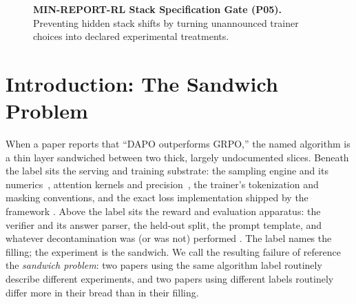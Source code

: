 \documentclass{article}  \usepackage[preprint,nonatbib]{neurips_2026} \usepackage[numbers]{natbib}
\begin{document}
\begin{figure}[htbp]
\centering
{}
\caption{\textbf{MIN-REPORT-RL Stack Specification Gate (P05).} Preventing hidden stack shifts by turning unannounced trainer choices into declared experimental treatments.}
\label{fig:p5_minreport_gate}
\end{figure}
\section{Introduction: The Sandwich Problem}
\label{sec:p5-intro}
When a paper reports that ``DAPO outperforms GRPO,'' the named algorithm is a
thin layer sandwiched between two thick, largely undocumented slices. Beneath the
label sits the serving and training substrate: the sampling engine and its
numerics~\citep{kwon2023vllm, zheng2024sglang}, attention kernels and
precision~\citep{dao2022flashattention}, the trainer's tokenization and masking
conventions, and the exact loss implementation shipped by the framework
\citep{vonwerra2022trl, sheng2024verl, hu2024openrlhf, thinkingmachines2024tinker}.
Above the label sits the reward and evaluation apparatus: the verifier and its
answer parser, the held-out split, the prompt template, and whatever
decontamination was (or was not) performed \citep{zhang2024gsm1k,
riddell2024contamination}. The label names the filling; the experiment is the
sandwich. We call the resulting failure of reference the \emph{sandwich problem}:
two papers using the same algorithm label routinely describe different
experiments, and two papers using different labels routinely differ more in their
bread than in their filling.
\end{document}
